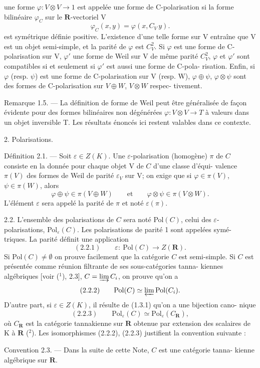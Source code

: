 
une forme $\varphi : V \otimes V \to 1$ est appelée une forme de C-polarisation si la
forme bilinéaire $\varphi_C$ sur le $\mathbf{R}$-vectoriel V
\[ \varphi_C (x, y) = \varphi (x, C_V\, y). \]
est symétrique définie positive. L'existence d'une telle forme sur V entraîne
que V est un objet semi-simple, et la parité de $\varphi$ est $C_V^2$. Si $\varphi$ est une forme
de C-polarisation sur V, $\varphi'$ une forme de Weil sur V de même parité $C_V^2$,
$\varphi$ et $\varphi'$ sont compatibles si et seulement si $\varphi'$ est aussi une forme de C-pola-%
risation. Enfin, si $\varphi$ (resp. $\psi$) est une forme de C-polarisation sur V (resp. W),
$\varphi \oplus \psi$, $\varphi \otimes \psi$ sont des formes de C-polarisation sur $V \oplus W$, $V \otimes W$ respec-%
tivement.

Remarque 1.5. --- La définition de forme de Weil peut être généralisée
de façon évidente pour des formes bilinéaires non dégénérées $\varphi : V \otimes V \to T$
à valeurs dans un objet inversible T. Les résultats énoncés ici restent
valables dans ce contexte.

2. Polarisations.

Définition 2.1. --- Soit $\varepsilon \in Z(K)$. Une $\varepsilon$-polarisation (homogène) $\pi$
de $C$ consiste en la donnée pour chaque objet V de $C$ d'une classe d'équi-%
valence $\pi(V)$ des formes de Weil de parité $\varepsilon_V$ sur V; on exige que si
$\varphi \in \pi(V)$, $\psi \in \pi(W)$, alors
\[ \varphi \oplus \psi \in \pi (V \oplus W) \qquad \text{et} \qquad \varphi \otimes \psi \in \pi (V \otimes W). \]
L'élément $\varepsilon$ sera appelé la parité de $\pi$ et noté $\varepsilon(\pi)$.

2.2. L'ensemble des polarisations de $C$ sera noté Pol$(C)$, celui des
$\varepsilon$-polarisations, Pol$_\varepsilon(C)$. Les polarisations de parité 1 sont appelées symé-%
triques. La parité définit une application
\[ (2.2.1) \qquad \varepsilon : \ \mathrm{Pol}(C) \to Z(\mathbf{R}). \]
Si Pol$(C) \neq \emptyset$ on prouve facilement que la catégorie $C$ est semi-simple.
Si $C$ est présentée comme réunion filtrante de ses sous-catégories tanna-%
kiennes algébriques [voir (${}^1$), 2.3], $C = \varinjlim C_i$, on prouve qu'on a
\[ (2.2.2) \qquad \mathrm{Pol}(C) \simeq \varprojlim \mathrm{Pol}(C_i). \]
D'autre part, si $\varepsilon \in Z(K)$, il résulte de (1.3.1) qu'on a une bijection cano-%
nique
\[ (2.2.3) \qquad \mathrm{Pol}_\varepsilon(C) \simeq \mathrm{Pol}_\varepsilon(C_{\mathbf{R}}), \] \margin{\unsure{/}}
où $C_{\mathbf{R}}$ est la catégorie tannakienne sur $\mathbf{R}$ obtenue par extension des
scalaires de K à $\mathbf{R}$ (${}^2$). Les isomorphismes (2.2.2), (2.2.3) justifient la
convention suivante :

Convention 2.3. --- Dans la suite de cette Note, $C$ est une catégorie tanna-%
kienne algébrique sur $\mathbf{R}$.

